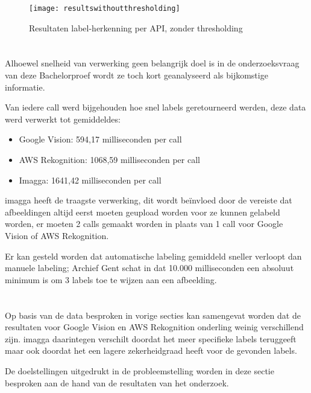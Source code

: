 \begin{figure}
    \centering    
    \texttt{[image: resultswithoutthresholding]}
    \caption{Resultaten label-herkenning per API, zonder thresholding}
    \label{fig:resultswithoutthresholding}
\end{figure}

\section{}
\label{sec:snelheid-per-api}
Alhoewel snelheid van verwerking geen belangrijk doel is in de onderzoeksvraag van deze Bachelorproef wordt ze toch kort geanalyseerd als bijkomstige informatie.

Van iedere call werd bijgehouden hoe snel labels geretourneerd werden, deze data werd verwerkt tot gemiddeldes:
\begin{itemize}
    \item Google Vision: 594,17 milliseconden per call
    \item AWS Rekognition: 1068,59 milliseconden per call
    \item Imagga: 1641,42 milliseconden per call
\end{itemize}

imagga heeft de traagste verwerking, dit wordt beïnvloed door de vereiste  dat afbeeldingen altijd eerst moeten geupload worden voor ze kunnen gelabeld worden, er moeten 2 calls gemaakt worden in plaats van 1 call voor Google Vision of AWS Rekognition.

Er kan gesteld worden dat automatische labeling gemiddeld sneller verloopt dan manuele labeling; Archief Gent schat in dat 10.000 milliseconden een absoluut minimum is om 3 labels toe te wijzen aan een afbeelding.

\section{}
\label{sec:besluit}
Op basis van de data besproken in vorige secties kan samengevat worden dat de resultaten voor Google Vision en AWS Rekognition onderling weinig verschillend zijn. imagga daarintegen verschilt doordat het meer specifieke labels teruggeeft maar ook doordat het een lagere zekerheidgraad heeft voor de gevonden labels.

De doelstellingen uitgedrukt in de probleemstelling worden in deze sectie besproken aan de hand van de resultaten van het onderzoek.

